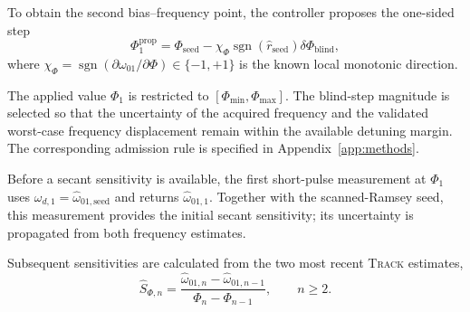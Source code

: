 To obtain the second bias--frequency point, the controller proposes the
one-sided step
%
\begin{equation}
\Phi_1^{\mathrm{prop}}
=
\Phi_{\mathrm{seed}}
-
\chi_\Phi
\operatorname{sgn}(\widehat r_{\mathrm{seed}})
\delta\Phi_{\mathrm{blind}},
\label{eq:blind-step}
\end{equation}
%
where
$\chi_\Phi
=\operatorname{sgn}(\partial\omega_{01}/\partial\Phi)
\in\{-1,+1\}$
is the known local monotonic direction.

The applied value $\Phi_1$ is restricted to
$[\Phi_{\min},\Phi_{\max}]$. The blind-step magnitude is selected so that
the uncertainty of the acquired frequency and the validated worst-case
frequency displacement remain within the available detuning margin. The
corresponding admission rule is specified in
Appendix~\ref{app:methods}.

Before a secant sensitivity is available, the first short-pulse measurement
at $\Phi_1$ uses
$\omega_{d,1}=\widehat\omega_{01,\mathrm{seed}}$
and returns $\widehat\omega_{01,1}$. Together with the scanned-Ramsey seed,
this measurement provides the initial secant sensitivity; its uncertainty is
propagated from both frequency estimates.


Subsequent sensitivities are calculated from the two most recent
\textsc{Track} estimates,
%
\begin{equation}
\widehat S_{\Phi,n}
=
\frac{
\widehat\omega_{01,n}
-
\widehat\omega_{01,n-1}
}{
\Phi_n-\Phi_{n-1}
},
\qquad n\geq2.
\label{eq:secant-sensitivity}
\end{equation}
%

